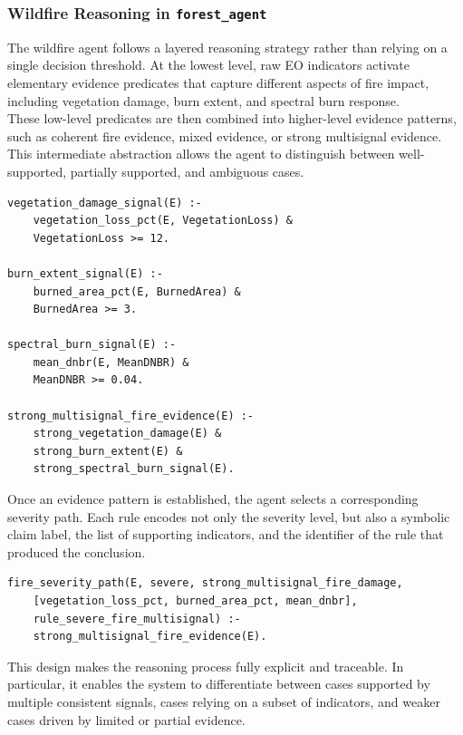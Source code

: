 \documentclass[12pt]{article}
\let\oldtexttt\texttt
\renewcommand{\texttt}[1]{{\fontsize{10.5}{12}\selectfont\oldtexttt{#1}}}
\begin{document}
\subsubsection{Wildfire Reasoning in \texttt{forest\_agent}}

The wildfire agent follows a layered reasoning strategy rather than relying on a single decision threshold. At the lowest level, raw EO indicators activate elementary evidence predicates that capture different aspects of fire impact, including vegetation damage, burn extent, and spectral burn response.\\

These low-level predicates are then combined into higher-level evidence patterns, such as coherent fire evidence, mixed evidence, or strong multisignal evidence. This intermediate abstraction allows the agent to distinguish between well-supported, partially supported, and ambiguous cases.

\begin{lstlisting}
vegetation_damage_signal(E) :-
    vegetation_loss_pct(E, VegetationLoss) &
    VegetationLoss >= 12.

burn_extent_signal(E) :-
    burned_area_pct(E, BurnedArea) &
    BurnedArea >= 3.

spectral_burn_signal(E) :-
    mean_dnbr(E, MeanDNBR) &
    MeanDNBR >= 0.04.

strong_multisignal_fire_evidence(E) :-
    strong_vegetation_damage(E) &
    strong_burn_extent(E) &
    strong_spectral_burn_signal(E).
\end{lstlisting}

Once an evidence pattern is established, the agent selects a corresponding severity path. Each rule encodes not only the severity level, but also a symbolic claim label, the list of supporting indicators, and the identifier of the rule that produced the conclusion.\\

\begin{lstlisting}
fire_severity_path(E, severe, strong_multisignal_fire_damage,
    [vegetation_loss_pct, burned_area_pct, mean_dnbr],
    rule_severe_fire_multisignal) :-
    strong_multisignal_fire_evidence(E).
\end{lstlisting}

This design makes the reasoning process fully explicit and traceable. In particular, it enables the system to differentiate between cases supported by multiple consistent signals, cases relying on a subset of indicators, and weaker cases driven by limited or partial evidence.\\
\end{document}
